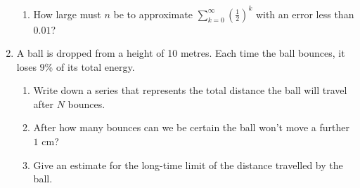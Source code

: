 \begin{enumerate}
\begin{enumerate}
            \item How large must $n$ be to approximate $\displaystyle \sum_{k=0}^\infty (\frac{1}{2})^k$ with an error less than $0.01$?
        \end{enumerate}

        \item A ball is dropped from a height of 10 metres. Each time the ball bounces, it loses $9$\% of its total energy. 
        
        \begin{enumerate}
            \item Write down a series that represents the total distance the ball will travel after $N$ bounces.
            \item After how many bounces can we be certain the ball won't move a further $1$ cm?
            \item Give an estimate for the long-time limit of the distance travelled by the ball.
        \end{enumerate}

\end{enumerate}